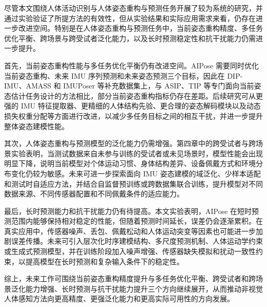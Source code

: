 尽管本文围绕人体活动识别与人体姿态重构与预测任务开展了较为系统的研究，并通过实验验证了所提方法的有效性，但从实验结果和实际应用需求来看，仍存在进一步改进空间。特别是在人体姿态重构与预测任务中，当前姿态重构精度、多任务优化平衡、跨场景与跨受试者泛化能力，以及长时预测稳定性和抗干扰能力仍需进一步提升。

首先，当前姿态重构性能与多任务优化平衡仍有改进空间。AIPose 需要同时优化当前姿态重构、未来 IMU 序列预测和未来姿态预测三个目标，因此在 DIP-IMU、AMASS 和 IMUPoser 等补充数据集上，与 ASIP、TIP 等专门面向当前姿态估计任务设计的方法相比，部分当前姿态重构指标仍存在差距。后续研究可从更强的 IMU 特征提取器、更精细的人体结构先验、更合理的姿态解码模块以及动态损失权重分配等方面进行改进，以减少多任务目标之间的相互干扰，并进一步提升整体姿态建模性能。

其次，人体姿态重构与预测模型的泛化能力仍需增强。第四章中的跨受试者与跨场景实验表明，当测试数据来自未参与训练的受试者或未见场景时，模型性能会出现明显下降，说明当前模型对个体运动习惯、身体结构差异、设备佩戴方式和环境分布变化仍较为敏感。未来可进一步探索面向 IMU 姿态建模的域泛化、少样本适配和测试时自适应方法，并结合自监督预训练或跨数据集联合训练，提升模型对不同数据来源、不同传感器配置和不同佩戴条件的适应能力。

最后，长时预测能力和抗干扰能力仍有待提高。本文实验表明，AIPose 在短时预测范围内能够保持相对稳定的性能，但随着预测时间延长，误差仍会逐渐累积。在真实应用中，传感器噪声、丢包、佩戴松动和人体运动突变等因素也可能进一步加剧误差传播。未来可引入层次化时序建模结构、多尺度预测机制、人体运动学约束或生成式预测模型，并在训练阶段加入噪声增强、传感器缺失模拟和扰动一致性约束，以提高模型在长时预测和复杂输入条件下的稳定性。

综上，未来工作可围绕当前姿态重构精度提升与多任务优化平衡、跨受试者和跨场景泛化能力增强、长时预测与抗干扰能力提升三个方向继续展开，从而推动非视觉人体感知方法向更高精度、更强泛化能力和更高实际可用性的方向发展。